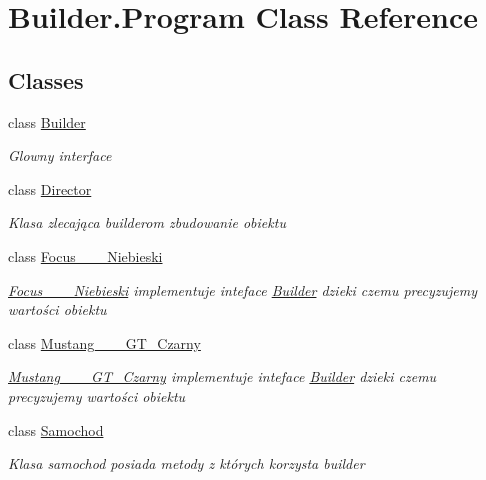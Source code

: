 \hypertarget{class_builder_1_1_program}{}\section{Builder.\+Program Class Reference}
\label{class_builder_1_1_program}
\subsection*{Classes}
\begin{DoxyCompactItemize}
\item 
class \hyperlink{class_builder_1_1_program_1_1_builder}{Builder}
\begin{DoxyCompactList}\small\item\em Glowny interface \end{DoxyCompactList}\item 
class \hyperlink{class_builder_1_1_program_1_1_director}{Director}
\begin{DoxyCompactList}\small\item\em Klasa zlecająca builderom zbudowanie obiektu \end{DoxyCompactList}\item 
class \hyperlink{class_builder_1_1_program_1_1_focus__2__0___niebieski}{Focus\+\_\+\_\+\_\+\+Niebieski}
\begin{DoxyCompactList}\small\item\em \hyperlink{class_builder_1_1_program_1_1_focus__2__0___niebieski}{Focus\+\_\+\_\+\_\+\+Niebieski} implementuje inteface \hyperlink{class_builder_1_1_program_1_1_builder}{Builder} dzieki czemu precyzujemy wartości obiektu \end{DoxyCompactList}\item 
class \hyperlink{class_builder_1_1_program_1_1_mustang__3__0___g_t___czarny}{Mustang\+\_\+\_\+\_\+\+G\+T\+\_\+\+Czarny}
\begin{DoxyCompactList}\small\item\em \hyperlink{class_builder_1_1_program_1_1_mustang__3__0___g_t___czarny}{Mustang\+\_\+\_\+\_\+\+G\+T\+\_\+\+Czarny} implementuje inteface \hyperlink{class_builder_1_1_program_1_1_builder}{Builder} dzieki czemu precyzujemy wartości obiektu \end{DoxyCompactList}\item 
class \hyperlink{class_builder_1_1_program_1_1_samochod}{Samochod}
\begin{DoxyCompactList}\small\item\em Klasa samochod posiada metody z których korzysta builder \end{DoxyCompactList}\end{DoxyCompactItemize}
